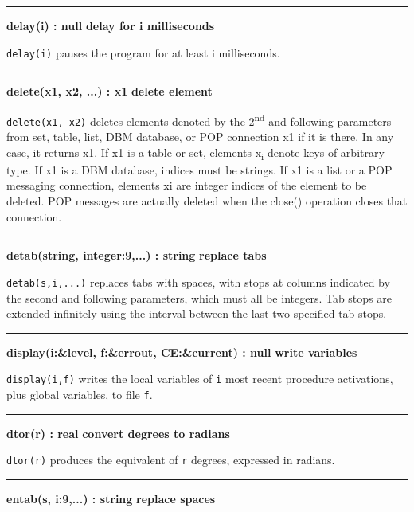 \bigskip\hrule\vspace{0.1cm}
\noindent
{\bf delay(i) : null } \hfill {\bf delay for i milliseconds}

\noindent
{}\texttt{delay(i)} pauses the program for at least i milliseconds.

\bigskip\hrule\vspace{0.1cm}
\noindent
{\bf delete(x1, x2, ...) : x1 } \hfill {\bf delete element}\WarningNotThreadSafe

\noindent
{}\texttt{delete(x1, x2)} deletes elements denoted by the
2\textsuperscript{nd} and following parameters from set, table, list,
DBM database, or POP connection x1 if it is there. In any case, it
returns x1. If x1 is a table or set, elements x\textsubscript{i} denote
keys of arbitrary type. If x1 is a DBM database, indices must be
strings. If x1 is a list or a POP messaging connection, elements xi are
integer indices of the element to be deleted. POP messages are actually
deleted when the close() operation closes that connection.

\bigskip\hrule\vspace{0.1cm}
\noindent
{\bf detab(string, integer:9,...) : string } \hfill {\bf replace tabs}

\noindent
\texttt{detab(s,i,...)} replaces tabs with spaces, with stops at columns
indicated by the second and following parameters, which must all be
integers. Tab stops are extended infinitely using the interval between
the last two specified tab stops.

\bigskip\hrule\vspace{0.1cm}
\noindent
{\bf display(i:\&level, f:\&errout, CE:\&current) : null } \hfill {\bf write variables}

\noindent
{}\texttt{display(i,f)} writes the local variables
of \texttt{i} most recent procedure activations, plus global
variables, to file \texttt{f}.

\bigskip\hrule\vspace{0.1cm}
\noindent
{\bf dtor(r) : real } \hfill {\bf convert degrees to radians}

\noindent
{}\texttt{dtor(r)}
produces the equivalent of \texttt{r} degrees, expressed in radians.

\bigskip\hrule\vspace{0.1cm}
\noindent
{\bf entab(s, i:9,...) : string } \hfill {\bf replace spaces}

